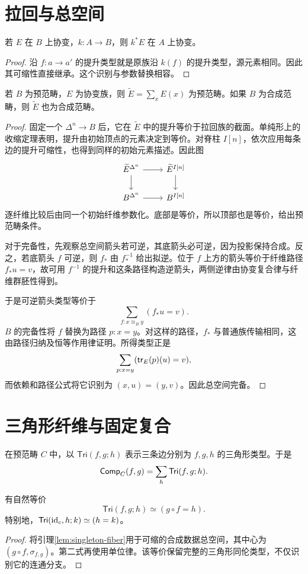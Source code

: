 \section{拉回与总空间}
\begin{proposition}[协变性对拉回稳定]
若 $E$ 在 $B$ 上协变，$k:A\to B$，则 $k^*E$ 在 $A$ 上协变。
\end{proposition}
\begin{proof}
沿 $f:a\to a'$ 的提升类型就是原族沿 $k(f)$ 的提升类型，源元素相同。因此其可缩性直接继承。这个识别与参数替换相容。
\end{proof}
\begin{theorem}[协变族的总空间]
若 $B$ 为预范畴，$E$ 为协变族，则 $\widetilde E=\sum_xE(x)$ 为预范畴。如果 $B$ 为合成范畴，则 $\widetilde E$ 也为合成范畴。
\end{theorem}
\begin{proof}
固定一个 $\Delta^n\to B$ 后，它在 $\widetilde E$ 中的提升等价于拉回族的截面。单纯形上的收缩定理表明，提升由初始顶点的元素决定到等价。对脊柱 $I[n]$，依次应用每条边的提升可缩性，也得到同样的初始元素描述。因此图
\[
\begin{tikzcd}
\widetilde E^{\Delta^n}\ar[r]\ar[d]&\widetilde E^{I[n]}\ar[d]\\
B^{\Delta^n}\ar[r]&B^{I[n]}
\end{tikzcd}
\]
逐纤维比较后由同一个初始纤维参数化。底部是等价，所以顶部也是等价，给出预范畴条件。

对于完备性，先观察总空间箭头若可逆，其底箭头必可逆，因为投影保持合成。反之，若底箭头 $f$ 可逆，则 $f_*$ 由 $f^{-1}_*$ 给出拟逆。位于 $f$ 上方的箭头等价于纤维路径 $f_*u=v$，故可用 $f^{-1}$ 的提升和这条路径构造逆箭头，两侧逆律由协变复合律与纤维群胚性得到。

于是可逆箭头类型等价于
\[
\sum_{f:x\cong_B y}(f_*u=v).
\]
$B$ 的完备性将 $f$ 替换为路径 $p:x=y$。对这样的路径，$f_*$ 与普通族传输相同，这由路径归纳及恒等作用律证明。所得类型正是
\[
\sum_{p:x=y}(\mathsf{tr}_E(p)(u)=v),
\]
而依赖和路径公式将它识别为 $(x,u)=(y,v)$。因此总空间完备。
\end{proof}

\section{三角形纤维与固定复合}
\begin{definition}[固定长边的三角形]
在预范畴 $C$ 中，以 $\mathsf{Tri}(f,g;h)$ 表示三条边分别为 $f,g,h$ 的三角形类型。于是
\[
\mathsf{Comp}_C(f,g)=\sum_h\mathsf{Tri}(f,g;h).
\]
\end{definition}
\begin{lemma}\label{lem:triangle-path}
有自然等价
\[
\mathsf{Tri}(f,g;h)\simeq(g\circ f=h).
\]
特别地，$\mathsf{Tri}(\operatorname{id}_c,h;k)\simeq(h=k)$。
\end{lemma}
\begin{proof}
将引理\ref{lem:singleton-fiber}用于可缩的合成数据总空间，其中心为 $(g\circ f,\sigma_{f,g})$。第二式再使用单位律。该等价保留完整的三角形同伦类型，不仅识别它的连通分支。
\end{proof}

